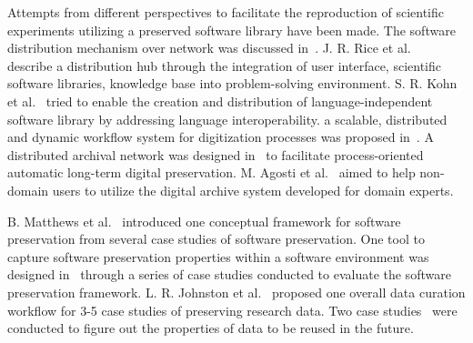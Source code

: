

Attempts from different perspectives to facilitate the reproduction of scientific experiments utilizing a preserved software library have been made. 
The software distribution mechanism over network was discussed in~\cite{compostella2010cdf, blomer2011cernvm}.
J. R. Rice et al.~\cite{rice1996scientific} describe a distribution hub through the integration of user interface, scientific software libraries, knowledge base into problem-solving environment.
S. R. Kohn et al.~\cite{kohn2001divorcing} tried to enable the creation and distribution of language-independent software library by addressing language interoperability.
a scalable, distributed and dynamic workflow system for digitization processes was proposed in~\cite{schoneberg2013scalable}.
A distributed archival network was designed in~\cite{subotic2013distributed} to facilitate process-oriented automatic long-term digital preservation.
M. Agosti et al.~\cite{agosti2012envisage} aimed to help non-domain users to utilize the digital archive system developed for domain experts.

B. Matthews et al.~\cite{matthews2008significant} introduced one conceptual framework for software preservation from several case studies of software preservation.
One tool to capture software preservation properties within a software environment was designed in~\cite{matthews2010framework} through a series of case studies conducted to evaluate the software preservation framework.
L. R. Johnston et al.~\cite{johnston2014workflow} proposed one overall data curation workflow for 3-5 case studies of preserving research data.
Two case studies~\cite{borgman2012data} were conducted to figure out the properties of data to be reused in the future.




